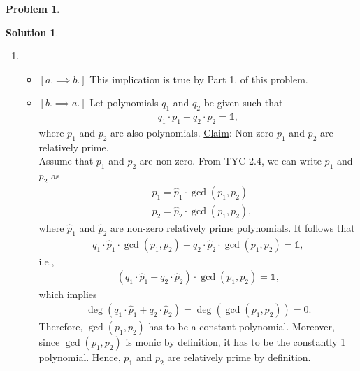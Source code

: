 \documentclass{book}
\theoremstyle{definition}
\newtheorem*{prob*}{Problem}
\newtheorem*{sln*}{Solution}
\begin{document}
\begin{prob*}
\begin{sln*}
\begin{enumerate}
	
	\item 
	\begin{itemize}
		\item $[a. \implies b.]$ This implication is true by Part 1. of this problem.
		\item $[b. \implies a.]$ Let polynomials $q_1$ and $q_2$ be given such that
		\begin{align*}
		q_1 \cdot p_1 + q_2 \cdot p_2 = \mathbb{1},
		\end{align*} 
		where $p_1$ and $p_2$ are also polynomials. \underline{Claim}: Non-zero $p_1$ and $p_2$ are relatively prime. \\
		
		Assume that $p_1$ and $p_2$ are non-zero. From TYC 2.4, we can write $p_1$ and $p_2$ as
		\begin{align*}
		&p_1 = \hat{p}_1 \cdot \gcd(p_1, p_2)\\
		&p_2 = \hat{p}_2 \cdot \gcd(p_1, p_2),
		\end{align*}
		where $\hat{p}_1$ and $\hat{p}_2$ are non-zero relatively prime polynomials. It follows that
		\begin{align*}
		q_1 \cdot \hat{p}_1 \cdot \gcd(p_1, p_2)  + q_2 \cdot \hat{p}_2 \cdot \gcd(p_1, p_2) = \mathbb{1},
		\end{align*}
		i.e.,
		\begin{align*}
		(q_1 \cdot \hat{p}_1 + q_2 \cdot \hat{p}_2 )\cdot \gcd(p_1, p_2) = \mathbb{1},
		\end{align*}
		which implies
		\begin{align*}
		\deg(q_1 \cdot \hat{p}_1 + q_2 \cdot \hat{p}_2) = \deg(\gcd(p_1,p_2)) = 0.
		\end{align*}
		Therefore, $\gcd(p_1, p_2)$ has to be a constant polynomial. Moreover, since $\gcd(p_1, p_2)$ is monic by definition, it has to be the constantly 1 polynomial. Hence, $p_1$ and $p_2$ are relatively prime by definition. 
	\end{itemize}



\end{enumerate}
\end{sln*}
\end{prob*}
\end{document}

